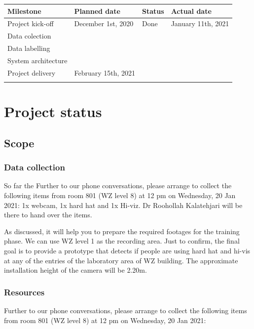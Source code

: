 \documentclass{article}
\begin{document}
\begin{center}
\begin{tabular}{llll}
Milestone & Planned date & Status & Actual date\\
\hline
Project kick-off & December 1st, 2020 & Done & January 11th, 2021\\
Data colection &  &  & \\
Data labelling &  &  & \\
System architecture &  &  & \\
Project delivery & February 15th, 2021 &  & \\
 &  &  & \\
\end{tabular}
\end{center}

\section{Project status}
\label{sec:org9a8f0e2}

\subsection{Scope}
\label{sec:org4066cac}

\subsubsection{Data collection}
\label{sec:org633bf48}
    So far the Further to our phone conversations, please arrange to collect the following items from room 801 (WZ level 8) at 12 pm on Wednesday, 20 Jan 2021:
1x webcam,
1x hard hat and
1x Hi-viz.
Dr Roohollah Kalatehjari will be there to hand over the items.

As discussed, it will help you to prepare the required footages for the training phase. We can use WZ level 1 as the recording area. Just to confirm, the final goal is to provide a prototype that detects if people are using hard hat and hi-vis at any of the entries of the laboratory area of WZ building. The approximate installation height of the camera will be 2.20m.


\subsubsection{Resources}
\label{sec:orgaa32820}
Further to our phone conversations, please arrange to collect the following items from room 801 (WZ level 8) at 12 pm on Wednesday, 20 Jan 2021:
\end{document}
